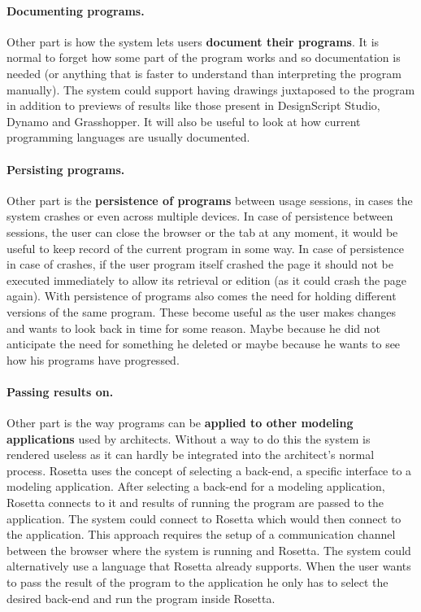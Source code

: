 \documentclass{./llncs2e/llncs}
\begin{document}
	\paragraph{Documenting programs.}
	Other part is how the system lets users \textbf{document their programs}. 
	It is normal to forget how some part of the program works and so documentation is needed (or anything that is faster to understand than interpreting the program manually).
	The system could support having drawings juxtaposed to the program in addition to previews of results like those present in DesignScript Studio, Dynamo and Grasshopper. 
	It will also be useful to look at how current programming languages are usually documented. 

	\paragraph{Persisting programs.}
	Other part is the \textbf{persistence of programs} between usage sessions, in cases the system crashes or even across multiple devices.
	In case of persistence between sessions, the user can close the browser or the tab at any moment, it would be useful to keep record of the current program in some way. 
	In case of persistence in case of crashes, if the user program itself crashed the page it should not be executed immediately to allow its retrieval or edition (as it could crash the page again). 
	With persistence of programs also comes the need for holding different versions of the same program. 
	These become useful as the user makes changes and wants to look back in time for some reason. 
	Maybe because he did not anticipate the need for something he deleted or maybe because he wants to see how his programs have progressed.

	\paragraph{Passing results on.}
	Other part is the way programs can be \textbf{applied to other modeling applications} used by architects.
	Without a way to do this the system is rendered useless as it can hardly be integrated into the architect's normal process. 
	Rosetta uses the concept of selecting a back-end, a specific interface to a modeling application. 
	After selecting a back-end for a modeling application, Rosetta connects to it and results of running the program are passed to the application. 
	The system could connect to Rosetta which would then connect to the application. 
	This approach requires the setup of a communication channel between the browser where the system is running and Rosetta. 
	The system could alternatively use a language that Rosetta already supports. 
	When the user wants to pass the result of the program to the application he only has to select the desired back-end and run the program inside Rosetta.
\end{document}
